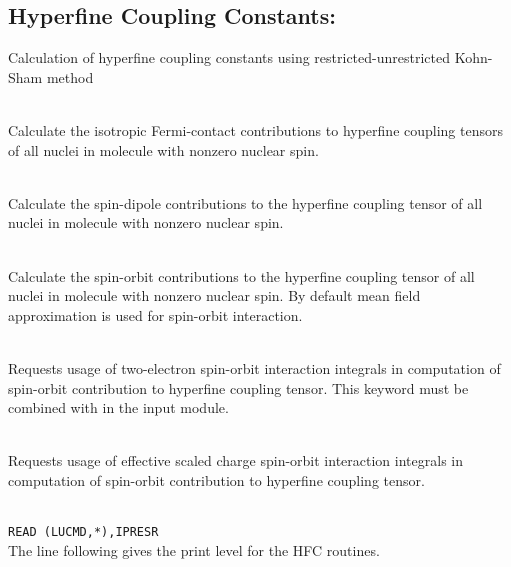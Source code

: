 \subsection{Hyperfine Coupling Constants: }

Calculation of hyperfine coupling constants using restricted-unrestricted Kohn-Sham method

\begin{description}
\item{} \\
Calculate the isotropic Fermi-contact contributions to hyperfine coupling tensors of all nuclei in 
molecule with nonzero nuclear spin. 

\item{} \\
Calculate the spin-dipole contributions to the hyperfine coupling tensor of all nuclei in molecule 
with nonzero nuclear spin.

\item{} \\
Calculate the spin-orbit contributions to the hyperfine coupling tensor of all nuclei in molecule 
with nonzero nuclear spin. By default mean field approximation is used for spin-orbit interaction. 

\item{} \\
Requests usage of two-electron spin-orbit interaction integrals in computation of spin-orbit contribution 
to hyperfine coupling tensor. This keyword must be combined with  in the  input module. 

\item{} \\
Requests usage of effective scaled charge spin-orbit interaction integrals in computation of spin-orbit contribution 
to hyperfine coupling tensor.

\item{}     \\
\verb|READ (LUCMD,*),IPRESR |\\
   The line following gives the print level for the HFC routines.

\end{description}
